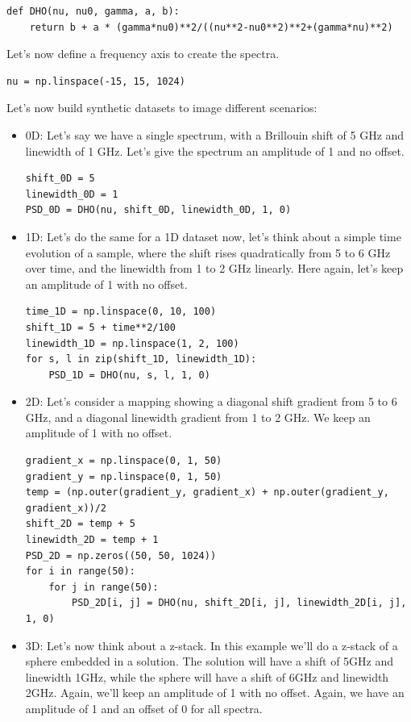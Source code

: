 \documentclass{article}
\begin{document}
\begin{lstlisting}
def DHO(nu, nu0, gamma, a, b):
    return b + a * (gamma*nu0)**2/((nu**2-nu0**2)**2+(gamma*nu)**2)
\end{lstlisting}

Let's now define a frequency axis to create the spectra.

\begin{lstlisting}
nu = np.linspace(-15, 15, 1024)
\end{lstlisting}

Let's now build synthetic datasets to image different scenarios:
\begin{itemize}
    \item 0D: Let's say we have a single spectrum, with a Brillouin shift of 5 GHz and linewidth of 1 GHz. Let's give the spectrum an amplitude of 1 and no offset.
\begin{lstlisting}
shift_0D = 5
linewidth_0D = 1
PSD_0D = DHO(nu, shift_0D, linewidth_0D, 1, 0)
\end{lstlisting}
    \item 1D: Let's do the same for a 1D dataset now, let's think about a simple time evolution of a sample, where the shift rises quadratically from 5 to 6 GHz over time, and the linewidth from 1 to 2 GHz linearly. Here again, let's keep an amplitude of 1 with no offset.
\begin{lstlisting}
time_1D = np.linspace(0, 10, 100)
shift_1D = 5 + time**2/100
linewidth_1D = np.linspace(1, 2, 100)
for s, l in zip(shift_1D, linewidth_1D):
    PSD_1D = DHO(nu, s, l, 1, 0)
\end{lstlisting}
    \item 2D: Let's consider a mapping showing a diagonal shift gradient from 5 to 6 GHz, and a diagonal linewidth gradient from 1 to 2 GHz. We keep an amplitude of 1 with no offset.
\begin{lstlisting}
gradient_x = np.linspace(0, 1, 50)
gradient_y = np.linspace(0, 1, 50)
temp = (np.outer(gradient_y, gradient_x) + np.outer(gradient_y, gradient_x))/2
shift_2D = temp + 5
linewidth_2D = temp + 1 
PSD_2D = np.zeros((50, 50, 1024))
for i in range(50):
    for j in range(50):
        PSD_2D[i, j] = DHO(nu, shift_2D[i, j], linewidth_2D[i, j], 1, 0) 
\end{lstlisting}
    \item 3D: Let's now think about a z-stack. In this example we'll do a z-stack of a sphere embedded in a solution. The solution will have a shift of 5GHz and linewidth 1GHz, while the sphere will have a shift of 6GHz and linewidth 2GHz. Again, we'll keep an amplitude of 1 with no offset. Again, we have an amplitude of 1 and an offset of 0 for all spectra.

\end{itemize}
\end{document}

